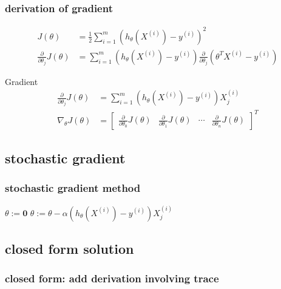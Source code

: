 \documentclass[11pt]{beamer}
\begin{document}
\begin{frame}
	\frametitle{derivation of gradient} 
	\begin{align*} 
	 J(\theta) &= \frac{1}{2} \sum_{i=1}^{m} (h_\theta (X^{(i)}) - y^{(i)})^2 \\
	\frac{\partial}{\partial \theta_j} J(\theta) &= \sum_{i=1}^{m} (h_\theta (X^{(i)}) - y^{(i)}) \frac{\partial}{\partial \theta_j} (\theta^T X^{(i)} - y^{(i)})
	\end{align*}
	\begin{block}{Gradient}
	\begin{align*}
	\frac{\partial}{\partial \theta_j} J(\theta) &= \sum_{i=1}^{m} (h_\theta (X^{(i)}) - y^{(i)}) X^{(i)}_j \\ 
	\nabla_\theta J(\theta)  &= 	\begin{bmatrix}
	\frac{\partial}{\partial \theta_0} J(\theta) & \frac{\partial}{\partial \theta_1} J(\theta)  & \cdots & \frac{\partial}{\partial \theta_n} J(\theta) 
								\end{bmatrix}^{T}
	\end{align*}
	\end{block}
\end{frame}

\subsection{stochastic gradient}
\begin{frame}
	\frametitle{stochastic gradient method}
	
\begin{algorithm}[H]
 	\SetAlgoLined
	$\theta := \mathbf{0}$ \;
	 {
		 {
			$\theta := \theta - \alpha (h_\theta (X^{(i)}) - y^{(i)}) X^{(i)}_j$  \;
		}
	}
 \caption{Stochastic gradient algorithm}
\end{algorithm}
	
\end{frame}

\subsection{closed form solution}
\begin{frame}
	\frametitle{closed form: add derivation involving trace}

\end{frame}
\end{document}

